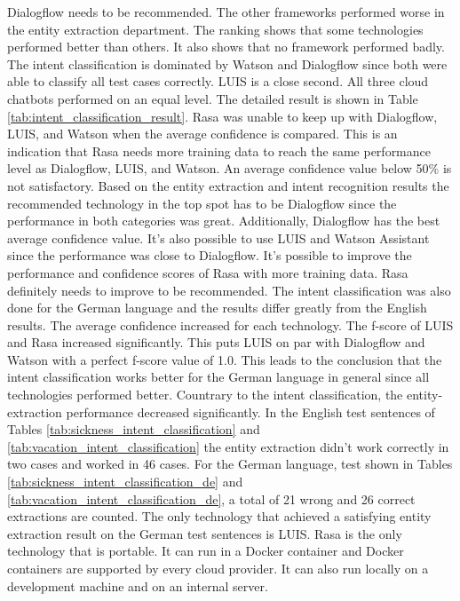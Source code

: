 Dialogflow needs to be recommended.
The other frameworks performed worse in the entity extraction 
department.
The ranking shows that some technologies performed better than others.
It also shows that no framework performed badly.
The intent classification is dominated by Watson and Dialogflow since 
both were able to classify all test cases correctly.
LUIS is a close second.
All three cloud chatbots performed on an equal level.
The detailed result is shown in Table \ref{tab:intent_classification_result}.
Rasa was unable to keep up with Dialogflow, LUIS, and Watson when the 
average confidence is compared.
This is an indication that Rasa needs more training data to 
reach the same performance level as Dialogflow, LUIS, and Watson.
An average confidence value below 50\% is not satisfactory.
Based on the entity extraction and intent recognition results
the recommended technology in the top spot has to be Dialogflow
since the performance in both categories was great.
Additionally, Dialogflow has the best average confidence value.
It's also possible to use LUIS and Watson Assistant since the performance was close to Dialogflow.
It's possible to improve the performance and confidence scores of Rasa with more training data.
Rasa definitely needs to improve to be recommended.
The intent classification was also done for the German language and the results differ greatly from the 
English results.
The average confidence increased for each technology.
The f-score of LUIS and Rasa increased significantly. 
This puts LUIS on par with Dialogflow and Watson with a perfect f-score value of 1.0.
This leads to the conclusion that the intent classification works better for the German 
language in general since all technologies performed better.
Countrary to the intent classification, the entity-extraction performance decreased significantly.
In the English test sentences of Tables \ref{tab:sickness_intent_classification} and \ref{tab:vacation_intent_classification}
the entity extraction didn't work correctly in two cases and worked in 46 cases.
For the German language, test shown in Tables \ref{tab:sickness_intent_classification_de} and \ref{tab:vacation_intent_classification_de},
a total of 21 wrong and 26 correct extractions are counted.
The only technology that achieved a satisfying entity extraction result on the German test sentences is LUIS.
Rasa is the only technology that is portable.
It can run in a Docker container and Docker containers are supported by every 
cloud provider.
It can also run locally on a development machine and on an internal server.
